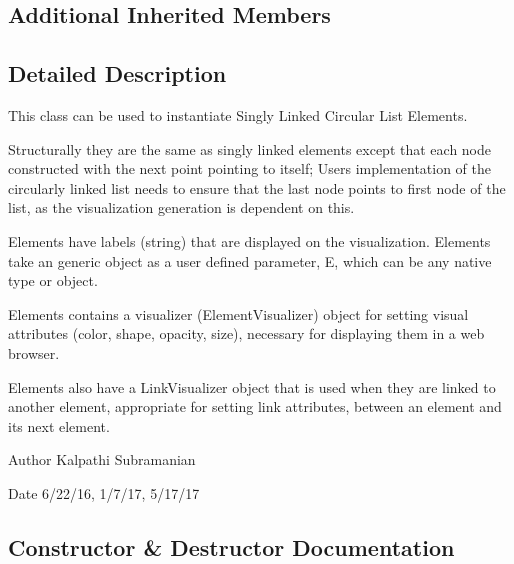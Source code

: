 \subsection*{Additional Inherited Members}


\subsection{Detailed Description}
This class can be used to instantiate Singly Linked Circular List Elements. 

Structurally they are the same as singly linked elements except that each node constructed with the next point pointing to itself; User\textquotesingle{}s implementation of the circularly linked list needs to ensure that the last node points to first node of the list, as the visualization generation is dependent on this.

Elements have labels (string) that are displayed on the visualization. Elements take an generic object as a user defined parameter, E, which can be any native type or object.

Elements contains a visualizer (Element\+Visualizer) object for setting visual attributes (color, shape, opacity, size), necessary for displaying them in a web browser.

Elements also have a Link\+Visualizer object that is used when they are linked to another element, appropriate for setting link attributes, between an element and its next element.

\begin{DoxyAuthor}{Author}
Kalpathi Subramanian
\end{DoxyAuthor}
\begin{DoxyDate}{Date}
6/22/16, 1/7/17, 5/17/17 
\end{DoxyDate}


\subsection{Constructor \& Destructor Documentation}
\hypertarget{classbridges_1_1circ__sl__element_1_1_circ_s_lelement_a71244079263999a87ada59f5f3deba07}{}
